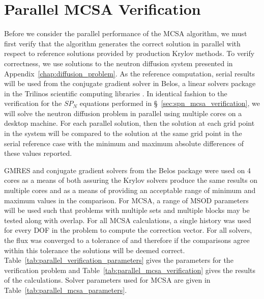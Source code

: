 \section{Parallel MCSA Verification\ }
\label{sec:parallel_verification}
Before we consider the parallel performance of the MCSA algorithm, we
must first verify that the algorithm generates the correct solution in
parallel with respect to reference solutions provided by production
Krylov methods. To verify correctness, we use solutions to the neutron
diffusion system presented in
Appendix~\ref{chap:diffusion_problem}. As the reference computation,
serial results will be used from the conjugate gradient solver in
Belos, a linear solvers package in the Trilinos scientific computing
libraries \citep{heroux_overview_2005}. In identical fashion to the
verification for the $SP_N$ equations performed in
\S~\ref{sec:spn_mcsa_verification}, we will solve the neutron
diffusion problem in parallel using multiple cores on a desktop
machine. For each parallel solution, then the solution at each grid
point in the system will be compared to the solution at the same grid
point in the serial reference case with the minimum and maximum
absolute differences of these values reported.

GMRES and conjugate gradient solvers from the Belos package were used
on 4 cores as a means of both assuring the Krylov solvers produce the
same results on multiple cores and as a means of providing an
acceptable range of minimum and maximum values in the comparison. For
MCSA, a range of MSOD parameters will be used such that problems with
multiple sets and multiple blocks may be tested along with
overlap. For all MCSA calculations, a single history was used for
every DOF in the problem to compute the correction vector. For all
solvers, the flux was converged to a tolerance of  and
therefore if the comparisons agree within this tolerance the solutions
will be deemed
correct. Table~\ref{tab:parallel_verification_parameters} gives the
parameters for the verification problem and
Table~\ref{tab:parallel_mcsa_verification} gives the results of the
calculations. Solver parameters used for MCSA are given in
Table~\ref{tab:parallel_mcsa_parameters}.


